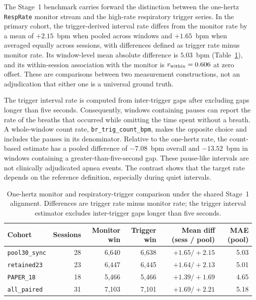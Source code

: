 The Stage~1 benchmark carries forward the distinction between the one-hertz
\texttt{RespRate} monitor stream and the high-rate respiratory trigger series. In the primary
cohort, the trigger-derived interval rate differs from the monitor rate by a mean of
$+2.15$~bpm when pooled across windows and $+1.65$~bpm when averaged equally across sessions,
with differences defined as trigger rate minus monitor rate.
Its window-level mean absolute difference is $5.03$~bpm (Table~\ref{tab:ch4_dual_reference}), and its within-session association with
the monitor is $r_{\mathrm{within}}=0.606$ at zero offset. These are comparisons between two measurement
constructions, not an adjudication that either one is a universal ground truth.

The trigger interval rate is computed from inter-trigger gaps after excluding gaps longer than
five seconds. Consequently, windows containing pauses can report the rate of the breaths that
occurred while omitting the time spent without a breath. A whole-window count rate,
\texttt{br\_trig\_count\_bpm}, makes the opposite choice and includes the pauses in its
denominator. Relative to the one-hertz rate, the count-based estimate has a pooled difference of
$-7.08$~bpm overall and $-13.52$~bpm in windows containing a greater-than-five-second gap.
These pause-like intervals are not clinically adjudicated apnea events. The contrast shows that
the target rate depends on the reference definition, especially during quiet intervals.

\begin{table}[htbp]
  \centering
  \footnotesize
  \setlength{\tabcolsep}{4.5pt}
  \caption{One-hertz monitor and respiratory-trigger comparison under the shared Stage~1
  alignment. Differences are trigger rate minus monitor rate; the trigger interval estimator
  excludes inter-trigger gaps longer than five seconds.}
  \label{tab:ch4_dual_reference}
  \begin{tabularx}{\textwidth}{@{}>{\raggedright\arraybackslash}Xrrrrr@{}}
    \toprule
    Cohort & Sessions & Monitor win & Trigger win & Mean diff (sess / pool) & MAE (pool) \\
    \midrule
    \texttt{pool30\_sync} & 28 & 6,640 & 6,638 & $+1.65 / +2.15$ & 5.03 \\
    \texttt{retained23} & 23 & 6,447 & 6,445 & $+1.64 / +2.13$ & 5.01 \\
    \texttt{PAPER\_18} & 18 & 5,466 & 5,466 & $+1.39 / +1.69$ & 4.65 \\
    \texttt{all\_paired} & 31 & 7,103 & 7,101 & $+1.69 / +2.21$ & 5.18 \\
    \bottomrule
  \end{tabularx}
\end{table}


